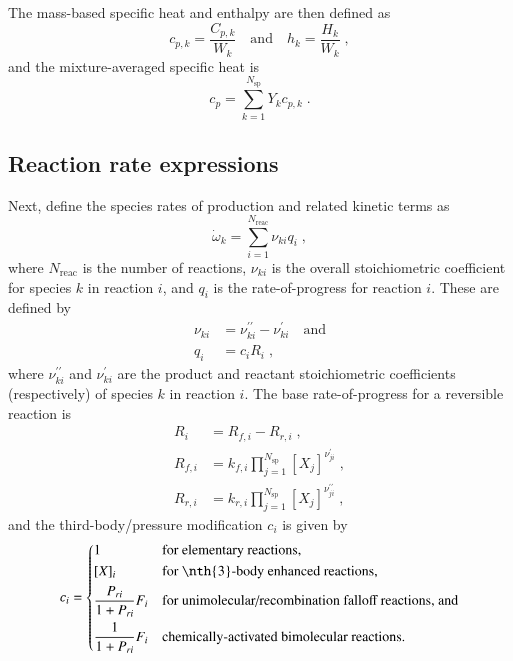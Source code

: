 \documentclass[preprint,12pt]{elsarticle}
\newcommand{ \numsp }{N_{\text{sp}}}
\begin{document}
The mass-based specific heat and enthalpy are then defined as
\begin{equation}
c_{p,k} = \frac{C_{p,k}}{W_k} \quad \text{and} \quad h_k = \frac{H_k}{W_k} \;,
\end{equation}
and the mixture-averaged specific heat is
\begin{equation}
c_p = \sum_{k=1}^{\numsp} Y_k c_{p,k} \;.
\end{equation}

\subsection{Reaction rate expressions}

Next, define the species rates of production and related kinetic terms as
\begin{equation}
\dot{\omega}_k = \sum_{i=1}^{N_{\text{reac}}} \nu_{k i} q_i \;,
\end{equation}
where $N_{\text{reac}}$ is the number of reactions, $\nu_{k i}$ is the overall stoichiometric coefficient for species $k$ in reaction $i$, and $q_i$ is the rate-of-progress for reaction $i$.
These are defined by
\begin{align}
\nu_{k i} &= \nu_{k i}^{\prime \prime} - \nu_{k i}^{\prime}  \quad \text{and} \\
q_i &= c_i R_i \;,
\end{align}
where $\nu_{k i}^{\prime \prime}$ and $\nu_{k i}^{\prime}$ are the product and reactant stoichiometric coefficients (respectively) of species $k$ in reaction $i$.
The base rate-of-progress for a reversible reaction is
\begin{align}
R_i &= R_{f, i} - R_{r, i} \;, \\
R_{f, i} &= k_{f, i} \prod_{j = 1}^{\numsp} [X_j]^{\nu_{j i}^{\prime}} \;, \\
R_{r, i} &= k_{r, i} \prod_{j = 1}^{\numsp} [X_j]^{\nu_{j i}^{\prime \prime}} \;,
\end{align}
and the third-body\slash pressure modification $c_i$ is given by
\begin{equation}
c_i = \begin{dcases}
  1 &\text{for elementary reactions,} \\
  [X]_i &\text{for \nth{3}-body enhanced reactions,} \\
  \frac{P_{r i}}{1 + P_{r i}} F_i &\text{for unimolecular/recombination falloff reactions, and} \\
  \frac{1}{1 + P_{r i}} F_i &\text{chemically-activated bimolecular reactions.}
  \end{dcases}
\label{e:rxn_pressure}
\end{equation}
\end{document}
